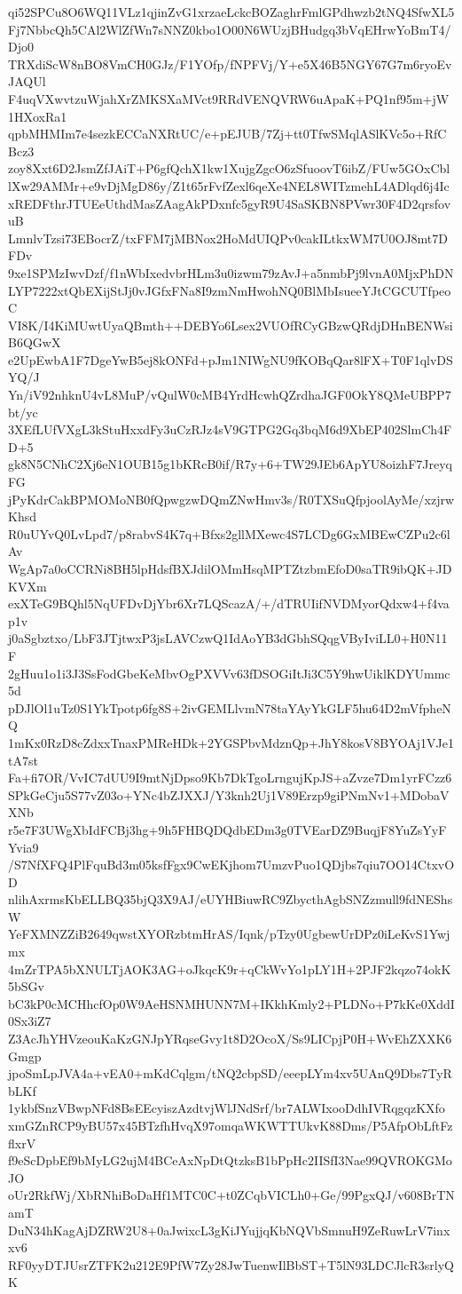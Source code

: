 qi52SPCu8O6WQ11VLz1qjinZvG1xrzaeLckcBOZaghrFmlGPdhwzb2tNQ4SfwXL5
Fj7NbbcQh5CAl2WlZfWn7sNNZ0kbo1O00N6WUzjBHudgq3bVqEHrwYoBmT4/Djo0
TRXdiScW8nBO8VmCH0GJz/F1YOfp/fNPFVj/Y+e5X46B5NGY67G7m6ryoEvJAQUl
F4uqVXwvtzuWjahXrZMKSXaMVct9RRdVENQVRW6uApaK+PQ1nf95m+jW1HXoxRa1
qpbMHMIm7e4sezkECCaNXRtUC/e+pEJUB/7Zj+tt0TfwSMqlASlKVc5o+RfCBcz3
zoy8Xxt6D2JsmZfJAiT+P6gfQchX1kw1XujgZgcO6zSfuoovT6ibZ/FUw5GOxCbl
lXw29AMMr+e9vDjMgD86y/Z1t65rFvfZexl6qeXe4NEL8WITzmehL4ADlqd6j4Ic
xREDFthrJTUEeUthdMasZAagAkPDxnfc5gyR9U4SaSKBN8PVwr30F4D2qrsfovuB
LmnlvTzsi73EBocrZ/txFFM7jMBNox2HoMdUIQPv0cakILtkxWM7U0OJ8mt7DFDv
9xe1SPMzIwvDzf/f1nWbIxedvbrHLm3u0izwm79zAvJ+a5nmbPj9lvnA0MjxPhDN
LYP7222xtQbEXijStJj0vJGfxFNa8I9zmNmHwohNQ0BlMbIsueeYJtCGCUTfpeoC
VI8K/I4KiMUwtUyaQBmth++DEBYo6Lsex2VUOfRCyGBzwQRdjDHnBENWsiB6QGwX
e2UpEwbA1F7DgeYwB5ej8kONFd+pJm1NIWgNU9fKOBqQar8lFX+T0F1qlvDSYQ/J
Yn/iV92nhknU4vL8MuP/vQulW0cMB4YrdHcwhQZrdhaJGF0OkY8QMeUBPP7bt/yc
3XEfLUfVXgL3kStuHxxdFy3uCzRJz4sV9GTPG2Gq3bqM6d9XbEP402SlmCh4FD+5
gk8N5CNhC2Xj6eN1OUB15g1bKRcB0if/R7y+6+TW29JEb6ApYU8oizhF7JreyqFG
jPyKdrCakBPMOMoNB0fQpwgzwDQmZNwHmv3s/R0TXSuQfpjoolAyMe/xzjrwKhsd
R0uUYvQ0LvLpd7/p8rabvS4K7q+Bfxs2gllMXewc4S7LCDg6GxMBEwCZPu2c6lAv
WgAp7a0oCCRNi8BH5lpHdsfBXJdilOMmHsqMPTZtzbmEfoD0saTR9ibQK+JDKVXm
exXTeG9BQhl5NqUFDvDjYbr6Xr7LQScazA/+/dTRUIifNVDMyorQdxw4+f4vap1v
j0aSgbztxo/LbF3JTjtwxP3jsLAVCzwQ1IdAoYB3dGbhSQqgVByIviLL0+H0N11F
2gHuu1o1i3J3SsFodGbeKeMbvOgPXVVv63fDSOGiItJi3C5Y9hwUiklKDYUmmc5d
pDJlOl1uTz0S1YkTpotp6fg8S+2ivGEMLlvmN78taYAyYkGLF5hu64D2mVfpheNQ
1mKx0RzD8cZdxxTnaxPMReHDk+2YGSPbvMdznQp+JhY8kosV8BYOAj1VJe1tA7st
Fa+fi7OR/VvIC7dUU9I9mtNjDpso9Kb7DkTgoLrngujKpJS+aZvze7Dm1yrFCzz6
SPkGeCju5S77vZ03o+YNc4bZJXXJ/Y3knh2Uj1V89Erzp9giPNmNv1+MDobaVXNb
r5e7F3UWgXbIdFCBj3hg+9h5FHBQDQdbEDm3g0TVEarDZ9BuqjF8YuZsYyFYvia9
/S7NfXFQ4PlFquBd3m05ksfFgx9CwEKjhom7UmzvPuo1QDjbs7qiu7OO14CtxvOD
nlihAxrmsKbELLBQ35bjQ3X9AJ/eUYHBiuwRC9ZbycthAgbSNZzmull9fdNEShsW
YeFXMNZZiB2649qwstXYORzbtmHrAS/Iqnk/pTzy0UgbewUrDPz0iLeKvS1Ywjmx
4mZrTPA5bXNULTjAOK3AG+oJkqcK9r+qCkWvYo1pLY1H+2PJF2kqzo74okK5bSGv
bC3kP0cMCHhcfOp0W9AeHSNMHUNN7M+IKkhKmly2+PLDNo+P7kKe0XddI0Sx3iZ7
Z3AcJhYHVzeouKaKzGNJpYRqseGvy1t8D2OcoX/Ss9LICpjP0H+WvEhZXXK6Gmgp
jpoSmLpJVA4a+vEA0+mKdCqlgm/tNQ2cbpSD/eeepLYm4xv5UAnQ9Dbs7TyRbLKf
1ykbfSnzVBwpNFd8BsEEcyiszAzdtvjWlJNdSrf/br7ALWIxooDdhIVRqgqzKXfo
xmGZnRCP9yBU57x45BTzfhHvqX97omqaWKWTTUkvK88Dms/P5AfpObLftFzflxrV
f9eScDpbEf9bMyLG2ujM4BCeAxNpDtQtzksB1bPpHc2IISfI3Nae99QVROKGMoJO
oUr2RkfWj/XbRNhiBoDaHf1MTC0C+t0ZCqbVICLh0+Ge/99PgxQJ/v608BrTNamT
DuN34hKagAjDZRW2U8+0aJwixcL3gKiJYujjqKbNQVbSmnuH9ZeRuwLrV7inxxv6
RF0yyDTJUsrZTFK2u212E9PfW7Zy28JwTuenwIlBbST+T5lN93LDCJlcR3srlyQK

